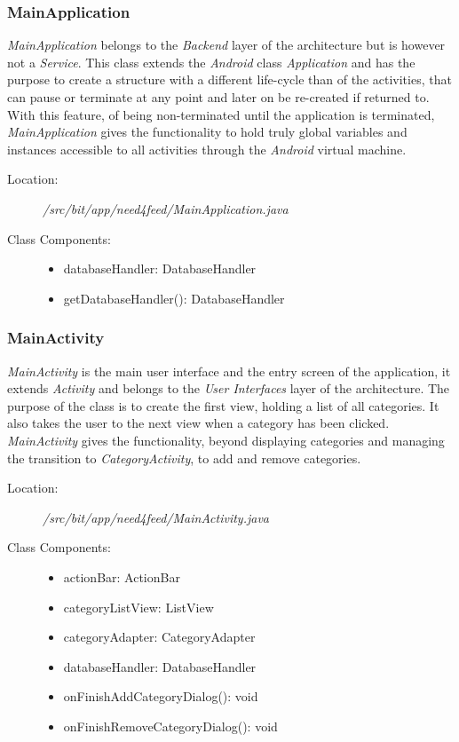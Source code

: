 \subsubsection{MainApplication}
\textit{MainApplication} belongs to the \textit{Backend} layer of the architecture but is however not a \textit{Service}. This class extends the \textit{Android} class \textit{Application} and has the purpose to create a structure with a different life-cycle than of the activities, that can pause or terminate at any point and later on be re-created if returned to. With this feature, of being non-terminated until the application is terminated, \textit{MainApplication} gives the functionality to hold truly global variables and instances accessible to all activities through the \textit{Android} virtual machine.
\begin{description}
  \item[Location:] \textit{/src/bit/app/need4feed/MainApplication.java} \hfill
  \item[Class Components:] \hfill
     \begin{itemize}
        \item databaseHandler: DatabaseHandler
        \item getDatabaseHandler(): DatabaseHandler
     \end{itemize}
\end{description}


\subsubsection{MainActivity}
\textit{MainActivity} is the main user interface and the entry screen of the application, it extends \textit{Activity} and belongs to the \textit{User Interfaces} layer of the architecture. The purpose of the class is to create the first view, holding a list of all categories. It also takes the user to the next view when a category has been clicked. \textit{MainActivity} gives the functionality, beyond displaying categories and managing the transition to \textit{CategoryActivity}, to add and remove categories.
\begin{description}
  \item[Location:] \textit{/src/bit/app/need4feed/MainActivity.java} \hfill
  \item[Class Components:] \hfill
     \begin{itemize}
        \item actionBar: ActionBar
        \item categoryListView: ListView
        \item categoryAdapter: CategoryAdapter
        \item databaseHandler: DatabaseHandler
        \item onFinishAddCategoryDialog(): void
        \item onFinishRemoveCategoryDialog(): void
     \end{itemize}
\end{description}


